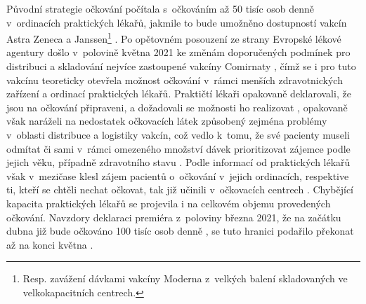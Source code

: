
Původní strategie očkování počítala s~očkováním až 50 tisíc osob denně v~ordinacích praktických lékařů, jakmile to bude umožněno dostupností vakcín Astra Zeneca a Janssen\footnote{Resp. zavážení dávkami vakcíny Moderna z~velkých balení skladovaných ve velkokapacitních centrech.} \cite{strategie_covid}. Po opětovném posouzení ze strany Evropské lékové agentury došlo v~polovině května 2021 ke změnám doporučených podmínek pro distribuci a skladování nejvíce zastoupené vakcíny Comirnaty \cite{logoc_pfizer_mrazak}, čímž se i pro tuto vakcínu teoreticky otevřela možnost očkování v~rámci menších zdravotnických zařízení a ordinací praktických lékařů. %
Praktičtí lékaři opakovaně deklarovali, že jsou na očkování připraveni, a dožadovali se možnosti ho realizovat \cite{logoc_svl,logoc_pripravenost}, opakovaně však naráželi na nedostatek očkovacích látek způsobený zejména problémy v~oblasti distribuce a logistiky vakcín, což vedlo k~tomu, že své pacienty museli odmítat či sami v~rámci omezeného množství dávek prioritizovat zájemce podle jejich věku, případně zdravotního stavu \cite{logo_logistika}. 
%
Podle informací od praktických lékařů však v~mezičase klesl zájem pacientů o~očkování v~jejich ordinacích, respektive ti, kteří se chtěli nechat očkovat, tak již učinili v~očkovacích centrech \cite{logo_praktici}. 
%
Chybějící kapacita praktických lékařů se projevila i na celkovém objemu provedených očkování. Navzdory deklaraci premiéra z~poloviny března 2021, že na začátku dubna již bude očkováno 100 tisíc osob denně \cite{logoc_100k}, se tuto hranici podařilo překonat až na konci května \cite{logoc_100kmame}. %





